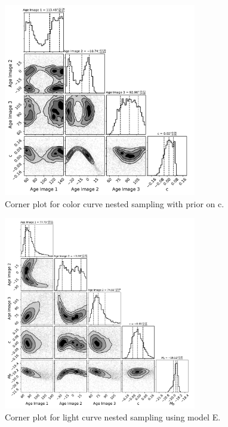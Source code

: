 \documentclass[twocolumn]{aastex63}
\begin{document}
\begin{figure}
    \centering
    \includegraphics[width=0.75\textwidth]{Images/corner_color_curve_fit_with_c_prior.pdf}
    \caption{Corner plot for color curve nested sampling with prior on c.}
    \label{fig:corner_cfit}
\end{figure}
\begin{figure}
    \centering
    \includegraphics[width=0.75\textwidth]{Images/corner_model_E.pdf}
    \caption{Corner plot for light curve nested sampling using model E.}
    \label{fig:corner_modelE}
\end{figure}
\end{document}
